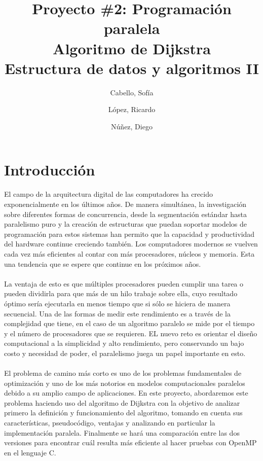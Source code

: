 \documentclass[11pt]{article}
\title{Proyecto \#2: Programación paralela\\
Algoritmo de Dijkstra\\
\large Estructura de datos y algoritmos II}
\author{Cabello, Sofía
\and López, Ricardo
\and Núñez, Diego}
\begin{document}
\maketitle{}

\section{Introducción}
El campo de la arquitectura digital de las computadores ha crecido exponencialmente en los últimos años. De manera simultánea, la investigación sobre diferentes formas de concurrencia, desde la segmentación estándar hasta paralelismo puro y la creación de estructuras que puedan soportar modelos de programación para estos sistemas han permito que la capacidad y productividad del hardware continue creciendo también. Los computadores modernos se vuelven cada vez más eficientes al contar con más procesadores, núcleos y memoria. Esta una tendencia que se espere que continue en los próximos años. 

\paragraph{}
La ventaja de esto es que múltiples procesadores pueden cumplir una tarea o pueden dividirla para que más de un hilo trabaje sobre ella, cuyo resultado óptimo sería ejecutarla en menos tiempo que si sólo se hiciera de manera secuencial. Una de las formas de medir este rendimiento es a través de la complejidad que tiene, en el caso de un algoritmo paralelo se mide por el tiempo y el número de procesadores que se requieren. EL nuevo reto es orientar el diseño computacional a la simplicidad y alto rendimiento, pero conservando un bajo costo y necesidad de poder, el paralelismo juega un papel importante en esto. 

\paragraph{}
El problema de camino más corto es uno de los problemas fundamentales de optimización y uno de los más notorios en modelos computacionales paralelos debido a su amplio campo de aplicaciones. En este proyecto, abordaremos este problema haciendo uso del algoritmo de Dijkstra con la objetivo de analizar primero la definición y funcionamiento del algoritmo, tomando en cuenta sus características, pseudocódigo, ventajas y analizando en particular la implementación paralela. Finalmente se hará una comparación entre las dos versiones para encontrar cuál resulta más eficiente al hacer pruebas con OpenMP en el lenguaje C. 
\end{document}
